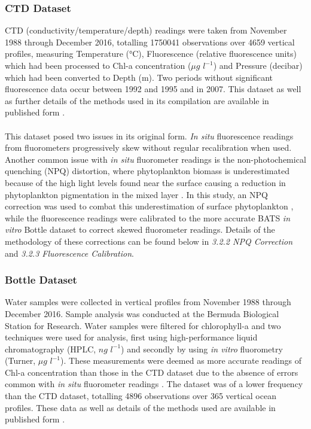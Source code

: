 \documentclass{article}
\begin{document}
\subsubsection{CTD Dataset}
CTD (conductivity/temperature/depth) readings were taken from November 1988 through December 2016, totalling 1750041 observations over 4659 vertical profiles, measuring Temperature (°C), Fluorescence (relative fluorescence units) which had been processed to Chl-a concentration ($\mu g$ $l ^{-1}$) and Pressure (decibar) which had been converted to Depth (m). Two periods without significant fluorescence data occur between 1992 and 1995 and in 2007. This dataset as well as further details of the methods used in its compilation are available in published form \citep{knap_bats_1997,johnson_chapter_nodate-1}. \\ \\
\noindent
This dataset posed two issues in its original form. \textit{In situ} fluorescence readings from fluorometers progressively skew without regular recalibration when used. Another common issue with \textit{in situ} fluorometer readings is the non-photochemical quenching (NPQ) distortion, where phytoplankton biomass is underestimated because of the high light levels found near the surface causing a reduction in phytoplankton pigmentation in the mixed layer \citep{holte_new_2009}. In this study, an NPQ correction was used to combat this underestimation of surface phytoplankton \citep{schmechtig_bio-argo_2018}, while the fluorescence readings were calibrated to the more accurate BATS \textit{in vitro} Bottle dataset to correct skewed fluorometer readings. Details of the methodology of these corrections can be found below in \textit{3.2.2 NPQ Correction} and \textit{3.2.3 Fluorescence Calibration}.
\subsubsection{Bottle Dataset}
Water samples were collected in vertical profiles from November 1988 through December 2016. Sample analysis was conducted at the Bermuda Biological Station for Research. Water samples were filtered for chlorophyll-a and two techniques were used for analysis, first using high-performance liquid chromatography (HPLC, $ng$ $l ^{-1}$) and secondly by using \textit{in vitro} fluorometry (Turner, $\mu g$ $l ^{-1}$). These measurements were deemed as more accurate readings of Chl-a concentration than those in the CTD dataset due to the absence of errors common with \textit{in situ} fluorometer readings \citep{gregor_freshwater_2004}. The dataset was of a lower frequency than the CTD dataset, totalling 4896 observations over 365 vertical ocean profiles. These data as well as details of the methods used are available in published form \citep{knap_bats_1997,rathbun_chapter_nodate}. 
\end{document}
